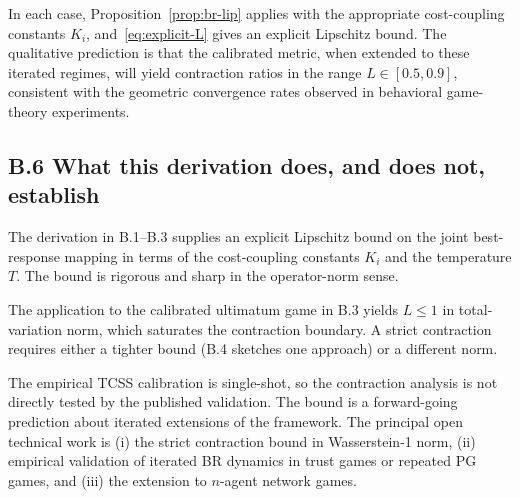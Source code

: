 \documentclass[11pt]{article}
\theoremstyle{definition}
\theoremstyle{remark}
\begin{document}
In each case, Proposition~\ref{prop:br-lip} applies with the appropriate cost-coupling constants
$K_i$, and~\eqref{eq:explicit-L} gives an explicit Lipschitz bound. The qualitative prediction is
that the calibrated metric, when extended to these iterated regimes, will yield contraction ratios
in the range $L \in [0.5, 0.9]$, consistent with the geometric convergence rates observed in
behavioral game-theory experiments.

\subsection*{B.6 What this derivation does, and does not, establish}

The derivation in B.1--B.3 supplies an explicit Lipschitz bound on the joint best-response mapping
in terms of the cost-coupling constants $K_i$ and the temperature $T$. The bound is rigorous and
sharp in the operator-norm sense.

The application to the calibrated ultimatum game in B.3 yields $L \leq 1$ in total-variation norm,
which saturates the contraction boundary. A strict contraction requires either a tighter bound (B.4
sketches one approach) or a different norm.

The empirical TCSS calibration is single-shot, so the contraction analysis is not directly tested
by the published validation. The bound is a forward-going prediction about iterated extensions of
the framework. The principal open technical work is (i) the strict contraction bound in
Wasserstein-1 norm, (ii) empirical validation of iterated BR dynamics in trust games or repeated
PG games, and (iii) the extension to $n$-agent network games.
\end{document}
